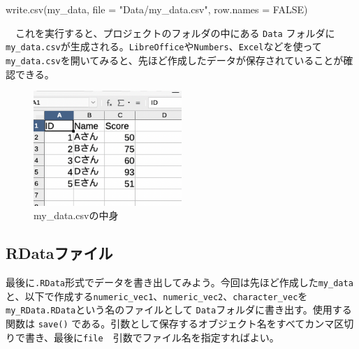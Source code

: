 \documentclass[
  a4paper,
  pandoc,
  ja=standard,
  jafont=haranoaji]{bxjsbook}
\newenvironment{Shaded}{\begin{snugshade}}{\end{snugshade}}
\newcommand{\AttributeTok}[1]{\textcolor[rgb]{0.00,0.48,0.65}{#1}}
\newcommand{\ConstantTok}[1]{\textcolor[rgb]{0.56,0.35,0.01}{#1}}
\newcommand{\FunctionTok}[1]{\textcolor[rgb]{0.28,0.35,0.67}{#1}}
\newcommand{\NormalTok}[1]{\textcolor[rgb]{0.00,0.48,0.65}{#1}}
\newcommand{\StringTok}[1]{\textcolor[rgb]{0.13,0.47,0.30}{#1}}
\begin{document}
\begin{Shaded}
\begin{Highlighting}[numbers=left,,]
\FunctionTok{write.csv}\NormalTok{(my\_data, }\AttributeTok{file =} \StringTok{"Data/my\_data.csv"}\NormalTok{, }\AttributeTok{row.names =} \ConstantTok{FALSE}\NormalTok{)}
\end{Highlighting}
\end{Shaded}

　これを実行すると、プロジェクトのフォルダの中にある \texttt{Data}
フォルダに\texttt{my\_data.csv}が生成される。\texttt{LibreOffice}や\texttt{Numbers}、\texttt{Excel}などを使って\texttt{my\_data.csv}を開いてみると、先ほど作成したデータが保存されていることが確認できる。

\begin{figure}

{\centering \includegraphics[width=0.5\textwidth,height=\textheight]{./Figs/IO/Export.png}

}

\caption{\label{fig-io_export}my\_data.csvの中身}

\end{figure}

\hypertarget{rdataux30d5ux30a1ux30a4ux30eb}{%
\subsection{RDataファイル}\label{rdataux30d5ux30a1ux30a4ux30eb}}

最後に\texttt{.RData}形式でデータを書き出してみよう。今回は先ほど作成した\texttt{my\_data}と、以下で作成する\texttt{numeric\_vec1}、\texttt{numeric\_vec2}、\texttt{character\_vec}を\texttt{my\_RData.RData}という名のファイルとして
\texttt{Data}フォルダに書き出す。使用する関数は \texttt{save()}
である。引数として保存するオブジェクト名をすべてカンマ区切りで書き、最後に\texttt{file}　引数でファイル名を指定すればよい。
\end{document}
